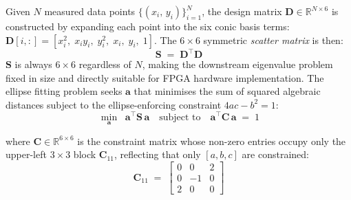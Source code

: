 \documentclass[colorlinks,upint,subscriptcorrection,varvw,hyphenate,balance,greek,russian,vietnamese,german]{asmeconf} %
\begin{document}
Given $N$ measured data points $\{(x_i,\,y_i)\}_{i=1}^{N}$,
the design matrix $\mathbf{D} \in \mathbb{R}^{N \times 6}$ is
constructed by expanding each point into the six conic basis terms:
$\mathbf{D}[i,:] = [x_i^2,\; x_iy_i,\; y_i^2,\; x_i,\; y_i,\; 1]$.
The $6\times6$ symmetric \emph{scatter matrix} is then:
\begin{equation}
	\mathbf{S} \;=\; \mathbf{D}^\top \mathbf{D}
	\label{eq:scatter}
\end{equation}
$\mathbf{S}$ is always $6\times6$ regardless of $N$,
making the downstream eigenvalue problem fixed in size
and directly suitable for FPGA hardware implementation.
The ellipse fitting problem seeks $\mathbf{a}$ that minimises
the sum of squared algebraic distances subject to the
ellipse-enforcing constraint $4ac - b^2 = 1$:
\begin{equation}
	\min_{\mathbf{a}} \;\;
	\mathbf{a}^\top \mathbf{S}\, \mathbf{a}
	\quad \text{subject to} \quad
	\mathbf{a}^\top \mathbf{C}\, \mathbf{a} \;=\; 1
	\label{eq:constrained}
\end{equation}

where $\mathbf{C} \in \mathbb{R}^{6\times6}$ is the constraint matrix
whose non-zero entries occupy only the upper-left $3\times3$ block
$\mathbf{C}_{11}$, reflecting that only $[a,b,c]$ are constrained:
\begin{equation}
	\mathbf{C}_{11} \;=\;
	\begin{bmatrix}
		0 & 0 & 2 \\
		0 & -1 & 0 \\
		2 & 0 & 0
	\end{bmatrix}
	\label{eq:C11}
\end{equation}
\end{document}
